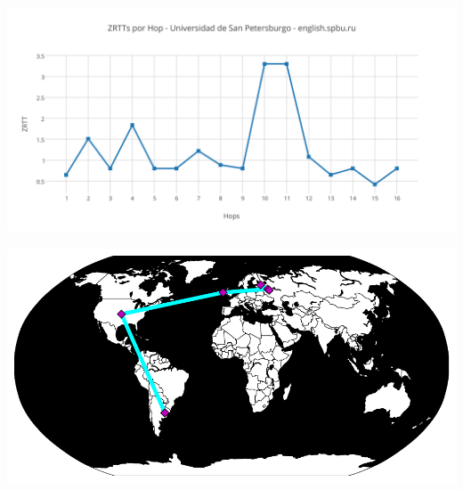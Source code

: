 \includegraphics[scale=0.65]{imagenes/rusia/ZRTTs.png} 

\begin{center}
\includegraphics[scale=0.8]{imagenes/rusia/rusia.pdf} 
\end{center}
